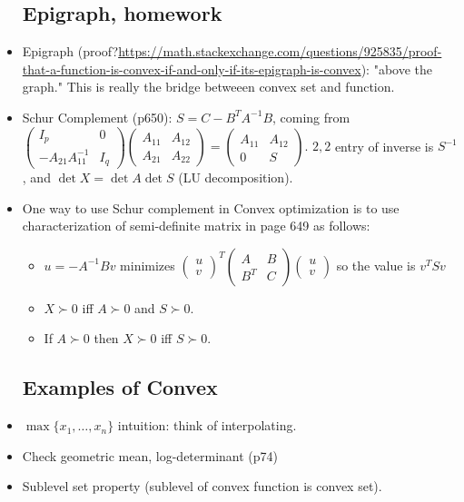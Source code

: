 \documentclass{article}
\theoremstyle{remark}
\begin{document}
\begin{itemize}
    \subsection*{Epigraph, homework}
    \item Epigraph (proof?\url{https://math.stackexchange.com/questions/925835/proof-that-a-function-is-convex-if-and-only-if-its-epigraph-is-convex}): "above the graph." This is really the bridge betweeen convex set and function.
    \item Schur Complement (p650): $S=C-B^T A^{-1}B$, coming from $\begin{pmatrix}
I_p & 0\\
-A_{21}A^{-1}_{11} & I_q
\end{pmatrix}
\begin{pmatrix}
A_{11} & A_{12}\\
A_{21} & A_{22}
\end{pmatrix}
=\begin{pmatrix}
A_{11} & A_{12}\\
0 & S
\end{pmatrix}.
$
    $2,2$ entry of inverse is $S^{-1}$, and $\det X=\det A\det S$ (LU decomposition).
    \item One way to use Schur complement in Convex optimization is to use characterization of semi-definite matrix in page 649 as follows:
    \begin{itemize}
        \item $u=-A^{-1}Bv$ minimizes $\begin{pmatrix} u\\v\end{pmatrix}^T\begin{pmatrix}
            A&B\\B^T&C
        \end{pmatrix}\begin{pmatrix}
            u\\v
        \end{pmatrix}$ so the value is $v^T Sv$
\item
        $X \succ 0$ iff $A\succ 0$ and $S\succ 0$.
        \item If $A\succ 0$ then $X\succ 0$ iff $S\succ 0$.
        \end{itemize}
        \subsection*{Examples of Convex}
        \item $\max\{x_1,\dots,x_n\}$ intuition: think of interpolating.
     \item Check geometric mean, log-determinant (p74)
     \item Sublevel set property (sublevel of convex function is convex set).

\end{itemize}
\end{document}
